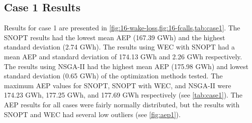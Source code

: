 \documentclass[a4paper]{jpconf}
\begin{document}
%
%

\subsection{Case 1 Results}
Results for case 1 are presented in \cref{fig:16-wake-loss,fig:16-fcalls,tab:case1}. The SNOPT results had the lowest mean AEP (167.39 GWh) and the highest standard deviation (2.74 GWh). The results using WEC with SNOPT had a mean AEP and standard deviation of 174.13 GWh and 2.26 GWh respectively. The results using NSGA-II had the highest mean AEP (175.98 GWh) and lowest standard deviation (0.65 GWh) of the optimization methods tested. The maximum AEP values for SNOPT, SNOPT with WEC, and NSGA-II were 174.23 GWh, 177.25 GWh, and 177.69 GWh respectively (see \cref{tab:case1}). The AEP results for all cases were fairly normally distributed, but the results with SNOPT and WEC had several low outliers (see \cref{fig:aep1}).
\end{document}
